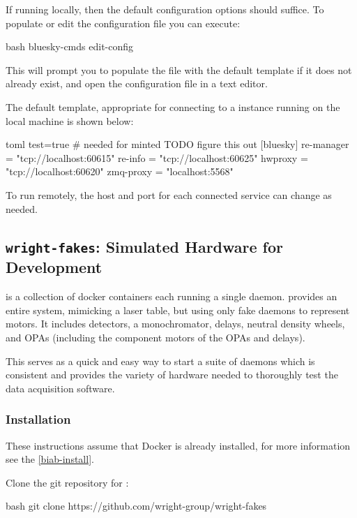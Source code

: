 If running locally, then the default configuration options should suffice.
To populate or edit the configuration file you can execute:

\begin{codefragment}{bash}
bluesky-cmds edit-config
\end{codefragment}

This will prompt you to populate the file with the default template if it does not already exist, and open the configuration file in a text editor.

The default template, appropriate for connecting to a \biab instance running on the local machine is shown below:

\begin{codefragment}{toml}
test=true # needed for minted TODO figure this out
[bluesky]
re-manager = "tcp://localhost:60615"
re-info = "tcp://localhost:60625"
hwproxy = "tcp://localhost:60620"
zmq-proxy = "localhost:5568"
\end{codefragment}

To run remotely, the host and port for each connected service can change as needed.

\subsection{\texttt{wright-fakes}: Simulated Hardware for Development}
\label{wright-fakes}

\wrightfakes is a collection of docker containers each running a single \yaq daemon.
\wrightfakes provides an entire system, mimicking a laser table, but using only fake daemons to represent motors.
It includes detectors, a monochromator, delays, neutral density wheels, and OPAs (including the component motors of the OPAs and delays).

This serves as a quick and easy way to start a suite of \yaq daemons which is consistent and provides the variety of hardware needed to thoroughly test the data acquisition software.

\subsubsection{Installation}
These instructions assume that Docker is already installed, for more information see the \ref{biab-install}.


Clone the git repository for \wrightfakes:

\begin{codefragment}{bash}
git clone https://github.com/wright-group/wright-fakes
\end{codefragment}

